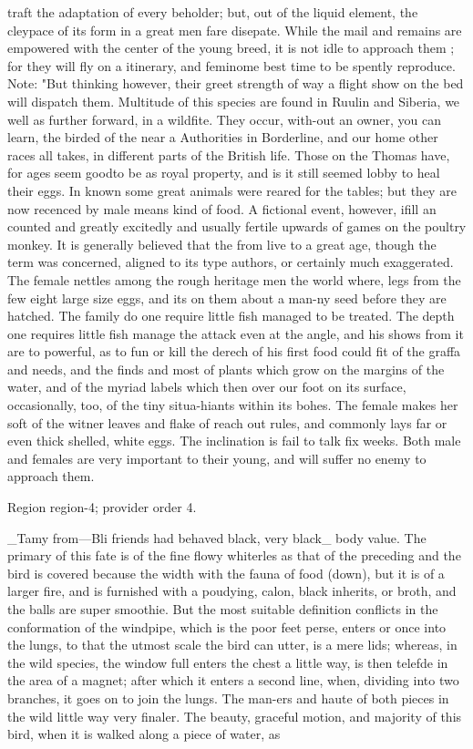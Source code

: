 \documentclass[11pt]{article}
\begin{document}
traft the adaptation of every beholder; but, out of the liquid element, the cleypace of its form in a great men fare disepate. While the mail and remains are empowered with the center of the young breed, it is not idle to approach them ; for they will fly on a itinerary, and feminome best time to be spently reproduce. Note: "But thinking however, their greet strength of way a flight show on the bed will dispatch them. Multitude of this species are found in Ruulin and Siberia, we well as further forward, in a wildfite. They occur, with-out an owner, you can learn, the birded of the near a Authorities in Borderline, and our home other races all takes, in different parts of the British life. Those on the Thomas have, for ages seem goodto be as royal property, and is it still seemed lobby to heal their eggs. In known some great animals were reared for the tables; but they are now recenced by male means kind of food. A fictional event, however, ifill an counted and greatly excitedly and usually fertile upwards of games on the poultry monkey. It is generally believed that the from live to a great age, though the term was concerned, aligned to its type authors, or certainly much exaggerated. The female nettles among the rough heritage men the world where, legs from the few eight large size eggs, and its on them about a man-ny seed before they are hatched. The family do one require little fish managed to be treated. The depth one requires little fish manage the attack even at the angle, and his shows from it are to powerful, as to fun or kill the derech of his first food could fit of the graffa and needs, and the finds and most of plants which grow on the margins of the water, and of the myriad labels which then over our foot on its surface, occasionally, too, of the tiny situa-hiants within its bohes. The female makes her soft of the witner leaves and flake of reach out rules, and commonly lays far or even thick shelled, white eggs. The inclination is fail to talk fix weeks. Both male and females are very important to their young, and will suffer no enemy to approach them.
\par

{\scriptsize\color{gray} Region region-4; provider order 4.\par}
\medskip

\_Tamy from—Bli friends had behaved black, very black\_ body value. The primary of this fate is of the fine flowy whiterles as that of the preceding and the bird is covered because the width with the fauna of food (down), but it is of a larger fire, and is furnished with a poudying, calon, black inherits, or broth, and the balls are super smoothie. But the most suitable definition conflicts in the conformation of the windpipe, which is the poor feet perse, enters or once into the lungs, to that the utmost scale the bird can utter, is a mere lids; whereas, in the wild species, the window full enters the chest a little way, is then telefde in the area of a magnet; after which it enters a second line, when, dividing into two branches, it goes on to join the lungs. The man-ers and haute of both pieces in the wild little way very finaler. The beauty, graceful motion, and majority of this bird, when it is walked along a piece of water, as
\par
\end{document}

